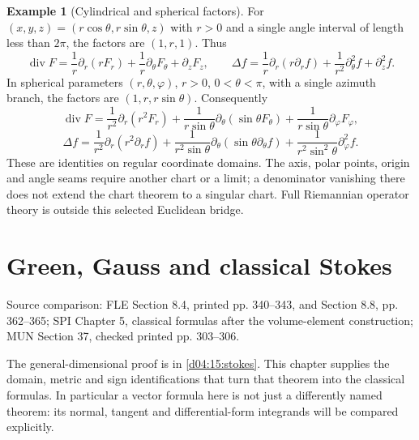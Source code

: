 \documentclass[11pt,oneside,openany]{book}
\theoremstyle{definition}
\newtheorem{example}[theorem]{Example}
\theoremstyle{remark}
\newcommand{\source}[1]{\par\begingroup\small\sffamily\color{black!65}Source comparison: #1\par\endgroup}
\begin{document}
\begin{example}[Cylindrical and spherical factors]\label{d04:11:coordinates}
For $(x,y,z)=(r\cos\theta,r\sin\theta,z)$ with $r>0$ and a single
angle interval of length less than $2\pi$, the factors are $(1,r,1)$.
Thus
\[
 \operatorname{div}F=\frac1r\partial_r(rF_r)+\frac1r\partial_\theta F_\theta+\partial_zF_z,
 \qquad\Delta f=\frac1r\partial_r(r\partial_rf)+\frac1{r^2}\partial_\theta^2f+\partial_z^2f.
\]
In spherical parameters $(r,\theta,\varphi)$, $r>0$, $0<\theta<\pi$,
with a single azimuth branch, the factors are $(1,r,r\sin\theta)$.
Consequently
\[
 \operatorname{div}F=\frac1{r^2}\partial_r(r^2F_r)
 +\frac1{r\sin\theta}\partial_\theta(\sin\theta F_\theta)
 +\frac1{r\sin\theta}\partial_\varphi F_\varphi,
\]
\[
 \Delta f=\frac1{r^2}\partial_r(r^2\partial_rf)
 +\frac1{r^2\sin\theta}\partial_\theta(\sin\theta\partial_\theta f)
 +\frac1{r^2\sin^2\theta}\partial_\varphi^2 f.
\]
These are identities on regular coordinate domains. The axis, polar points,
origin and angle seams require another chart or a limit; a denominator
vanishing there does not extend the chart theorem to a singular chart.
Full Riemannian operator theory is outside this selected Euclidean bridge.
\end{example}



\chapter{Green, Gauss and classical Stokes}
\label{ch:d04-12}
\source{FLE Section 8.4, printed pp. 340--343, and Section 8.8, pp. 362--365; SPI Chapter 5, classical formulas after the volume-element construction; MUN Section 37, checked printed pp. 303--306.}

The general-dimensional proof is in \cref{d04:15:stokes}. This chapter
supplies the domain, metric and sign identifications that turn that theorem
into the classical formulas. In particular a vector formula here is not
just a differently named theorem: its normal, tangent and differential-form
integrands will be compared explicitly.
\end{document}
